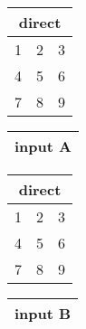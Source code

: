 \documentclass{article}
\begin{document}
\begin{tabular}[t]{|l|l|l|}
  \multicolumn{3}{c}{\textbf{direct}} \\ \hline
  1 & 2 & 3 \\ \hline
  4 & 5 & 6 \\ \hline
  7 & 8 & 9 \\ \hline
  \hline
\end{tabular}
\hspace{3ex}
\begin{tabular}[t]{|l|l|l|}
  \multicolumn{3}{c}{\textbf{input A}} \\ \hline
  
  \hline   %
\end{tabular}

\vspace{3ex}
\begin{tabular}[t]{|l|l|l|}
  \multicolumn{3}{c}{\textbf{direct}} \\ \hline
  1 & 2 & 3 \\ \hline
  4 & 5 & 6 \\ \hline
  7 & 8 & 9 \\
  \hline
\end{tabular}
\hspace{3ex}
\begin{tabular}[t]{|l|l|l|}
  \multicolumn{3}{c}{\textbf{input B}} \\ \hline
  
  \hline   %
\end{tabular}
\end{document}

